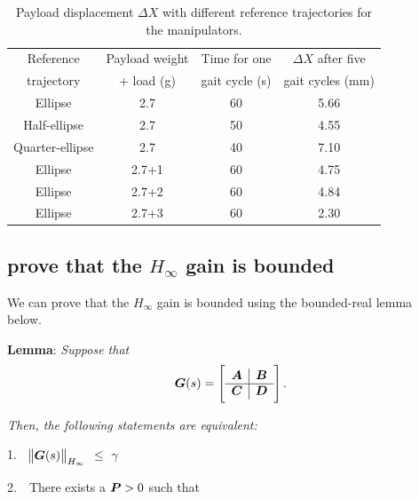 \begin{table}[t]
\centering
\caption{Payload displacement $\Delta X$ with different reference trajectories for the manipulators.}
\label{table:table_Payload displacement}
\begin{tabular}{c c c c}

\hline
Reference & Payload weight & Time for one & $\Delta X$ after five \\
trajectory & + load (g) & gait cycle (s) & gait cycles (mm)\\
\hline
Ellipse         & 2.7   & 60  & 5.66\\
Half-ellipse    & 2.7   & 50  & 4.55\\
Quarter-ellipse & 2.7   & 40  & 7.10\\
Ellipse         & 2.7+1 & 60  & 4.75\\
Ellipse         & 2.7+2 & 60  & 4.84\\
Ellipse         & 2.7+3 & 60  & 2.30\\
\hline
\end{tabular}
\end{table}

\subsection{prove that the ${H_{\infty}}$ gain is bounded}
We can prove that the ${H_{\infty}}$ gain is bounded using the bounded-real lemma~\cite{boyd1994} below. 

\textbf{Lemma}: \textit{Suppose that}
\begin{equation*}
\boldsymbol{G}(s)=\begin{bmatrix}
\begin{array}{c | c}
\boldsymbol{A}  &  \boldsymbol{B} \\
\hline
\boldsymbol{C}  & \boldsymbol{D}
\end{array}  
\end{bmatrix}.
\end{equation*}

\textit{Then, the following statements are equivalent:} 

1.~~$\norm{\boldsymbol{G}(s)}_{H_{\infty}}$ $\leq$ $\gamma$ \vspace{1mm}
    
2.~~There exists a $\boldsymbol{P} > 0$ such that 

